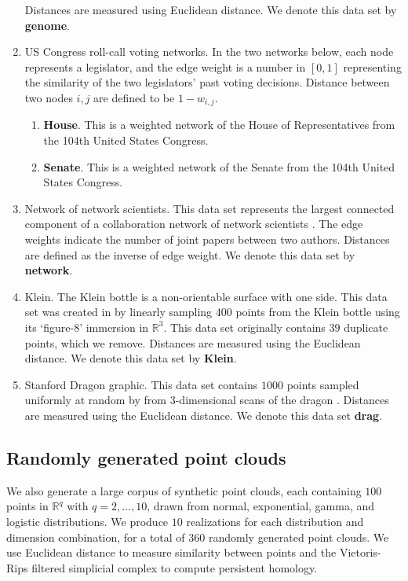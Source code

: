 \begin{enumerate}
    Distances are measured using Euclidean distance. We denote this data set by \textbf{genome}.
    \item US Congress roll-call voting networks. In the two networks below, each node represents a legislator, and the edge weight is a number in $[0,1]$ representing the similarity of the two legislators' past voting decisions. Distance between two nodes $i,j$ are defined to be $1-w_{i,j}$. 
    \begin{enumerate}
        \item \textbf{House}. This is a weighted network of the House of Representatives from the 104th United States Congress.  
        \item \textbf{Senate}. This is a weighted network of the Senate from the 104th United States Congress.
    \end{enumerate}
    \item Network of network scientists. This data set represents the largest connected component of a collaboration network of network scientists \cite{newman2006finding}. The edge weights indicate the number of joint papers between two authors. Distances are defined as the inverse of edge weight. 
    We denote this data set by \textbf{network}. 
    \item Klein. The Klein bottle is a non-orientable surface with one side. This data set was created in \cite{roadmap2017} by linearly sampling $400$ points from the Klein bottle using its  `figure-8' immersion in $\mathbb{R}^3$. This data set originally contains $39$ duplicate points, which we remove. Distances are measured using the Euclidean distance. 
    We denote this data set by \textbf{Klein}. 
    \item Stanford Dragon graphic. This data set contains $1000$ points sampled uniformly  at random by \cite{roadmap2017} from $3$-dimensional scans of the dragon \cite{drag}. Distances are measured using the Euclidean distance. We denote this data set \textbf{drag}. 
\end{enumerate}
\vspace{0.2cm}  
\subsection{Randomly generated point clouds}\label{sec: randompointclouds}
We also generate a large corpus of synthetic point clouds, each containing $100$ points in $\mathbb{R}^q$ with $q = 2,\ldots,10$, drawn from normal, exponential, gamma, and logistic distributions. We produce $10$ realizations for each distribution and dimension combination, for a total of $360$ randomly generated point clouds. We use Euclidean distance to measure similarity between points and the Vietoris- Rips filtered simplicial complex to compute persistent homology. 

